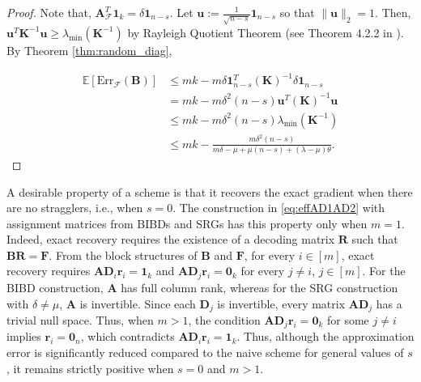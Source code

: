 \documentclass[journal,draftcls,onecolumn]{IEEEtran}
\theoremstyle{mystyle}
\newcommand{\bfA}{\mathbf{A}}
\newcommand{\cF}{\mathcal{F}}
\begin{document}
\begin{proof}
Note that, $\mathbf{A}_{\mathcal{F}}^T\mathbf{1}_k = \delta \mathbf{1}_{n-s}$. Let $ \mathbf{u} := \frac{1}{\sqrt{n-s}}\mathbf{1}_{n-s}$ so that $\|\mathbf{u}\|_2 = 1$. Then, 
 $\mathbf{u}^T \mathbf{K}^{-1} \mathbf{u} \ge \lambda_{\text{min}}(\mathbf{K}^{-1})$ by Rayleigh Quotient Theorem (see Theorem 4.2.2 in \cite{horn2012matrix}).
 By Theorem \ref{thm:random_diag}, 

\begin{align*}
\mathbb{E}[\text{Err}_{\mathcal{F}}(\mathbf{B})] 
& \le  mk - m\delta\mathbf{1}_{n-s}^T (\mathbf{K})^{-1} \delta \mathbf{1}_{n-s}\\
& = mk - m\delta^2(n-s)\mathbf{u}^T(\mathbf{K})^{-1}\mathbf{u}\\
& \le mk - m\delta^2(n-s)\lambda_{\text{min}}(\mathbf{K}^{-1})\\
& \le mk - \frac{m\delta^2(n-s)}{m\delta-\mu + \mu (n-s) + (\lambda - \mu) \theta}. 
\end{align*}
\end{proof}



A desirable property of a scheme is that it recovers the exact gradient when there are no stragglers, i.e., when $s=0$. The construction in  \eqref{eq:effAD1AD2} with assignment matrices from BIBDs and SRGs has this property only when $m=1$. Indeed, exact recovery requires the existence of a decoding matrix $\mathbf{R}$ such that $\mathbf{B}\mathbf{R}=\mathbf{F}$. From the block structures of $\mathbf{B}$ and $\mathbf{F}$, for every $i \in [m]$, exact recovery requires
$
\mathbf{A}\mathbf{D}_i\mathbf{r}_i=\mathbf{1}_k
$ and $
\mathbf{A}\mathbf{D}_j\mathbf{r}_i=\mathbf{0}_k
$ for every $j\neq i$, $j\in [m]$. For the BIBD construction, $\mathbf{A}$ has full column rank, whereas for the SRG construction with $\delta\neq\mu$, $\mathbf{A}$ is invertible. Since each $\mathbf{D}_j$ is invertible, every matrix $\mathbf{A}\mathbf{D}_j$ has a trivial null space. Thus, when $m>1$, the condition $
\mathbf{A}\mathbf{D}_j\mathbf{r}_i=\mathbf{0}_k
$ for some $j\neq i$ implies $\mathbf{r}_i=\mathbf{0}_n$, which contradicts
$
\mathbf{A}\mathbf{D}_i\mathbf{r}_i=\mathbf{1}_k.
$ Thus, although the approximation error is significantly reduced compared to the naive scheme for general values of $s$, it remains strictly positive when $s=0$ and $m>1$.
\end{document}
